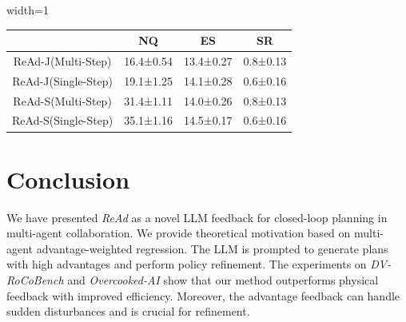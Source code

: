 \documentclass[11pt]{article}
\theoremstyle{plain}
\theoremstyle{remark}
\begin{document}
\begin{table}[t]
\centering
{}
\vspace{-0.8em}
\begin{adjustbox}{width=1\columnwidth}
\begin{tabular}{@{}cccc@{}}
\toprule
                      & NQ             & ES             & SR          \\ \midrule
ReAd-J(Multi-Step)    & 16.4±0.54         & 13.4±0.27           & 0.8±0.13       \\
ReAd-J(Single-Step)   & 19.1±1.25        & 14.1±0.28         & 0.6±0.16        \\ \midrule
ReAd-S(Multi-Step)    & 31.4±1.11       & 14.0±0.26       & 0.8±0.13     \\
ReAd-S(Single-Step)   & 35.1±1.16       & 14.5±0.17       & 0.6±0.16      \\ \bottomrule
\end{tabular}
\end{adjustbox}
\label{open_loop_results}
\vspace{-1.5em}
\end{table}

\section{Conclusion}
We have presented \emph{ReAd} as a novel LLM feedback for closed-loop planning in multi-agent collaboration. We provide theoretical motivation based on multi-agent advantage-weighted regression. The LLM is prompted to generate plans with high advantages and perform policy refinement. The experiments on \emph{DV-RoCoBench} and \emph{Overcooked-AI} show that our method outperforms physical feedback with improved efficiency. Moreover, the advantage feedback can handle sudden disturbances and is crucial for refinement.
\end{document}
